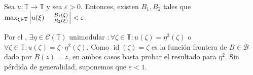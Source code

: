 \begin{teo}\label{teo:helson-sarason-aproximacion-fn-unimodular-continua-cociente-prod-finito-blaschke}
    Sea $u \colon \mathbb{T} \to \mathbb{T}$  y sea $\varepsilon > 0$. Entonces, existen $B_1, B_2$  tales que $\max_{\xi \in \mathbb{T}} \left|u(\xi) - \frac{B_1(\xi)}{B_2(\xi)}\right| < \varepsilon$. 
\end{teo}
\begin{dem}
    Por el , $\exists \eta \in \mathcal{C}(\mathbb{T})$ unimodular $ : \forall \zeta \in \mathbb{T} : u(\zeta) = \eta^2(\zeta)$ o $\forall \zeta \in \mathbb{T} : u(\zeta) = \zeta \cdot \eta^2(\zeta)$. Como $\operatorname{id}(\zeta) = \zeta$ es la función frontera de $B \in \mathscr{B}$ dado por $B(z) = z$, en ambos casos basta probar el resultado para $\eta^2$.
    Sin pérdida de generalidad, suponemos que $\varepsilon < 1$.
    

\end{dem}
